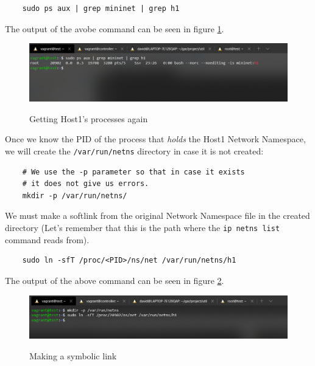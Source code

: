 \documentclass[12pt]{article}
\begin{document}
			\begin{verbatim}
	sudo ps aux | grep mininet | grep h1
			\end{verbatim}

			The output of the avobe command can be seen in figure \ref{f:h1_pid}.

			\begin{figure}[!htb]
				\centering
				\includegraphics[width=\linewidth]{h1_pid.png}
				\label{f:h1_pid}
				\caption{Getting Host1's processes again}
			\end{figure}

			Once we know the PID of the process that \textit{holds} the Host1 Network Namespace, we will create the \texttt{/var/run/netns} directory in case it is not created:

			\begin{verbatim}
	# We use the -p parameter so that in case it exists
	# it does not give us errors.
	mkdir -p /var/run/netns/
			\end{verbatim}

			We must make a softlink from the original Network Namespace file in the created directory (Let's remember that this is the path where the \texttt{ip netns list} command reads from).

			\begin{verbatim}
	sudo ln -sfT /proc/<PID>/ns/net /var/run/netns/h1
			\end{verbatim}

			The output of the above command can be seen in figure \ref{f:lnk}.

			\begin{figure}[!htb]
				\centering
				\includegraphics[width=\linewidth]{lnk.png}
				\label{f:lnk}
				\caption{Making a symbolic link}
			\end{figure}
\end{document}
